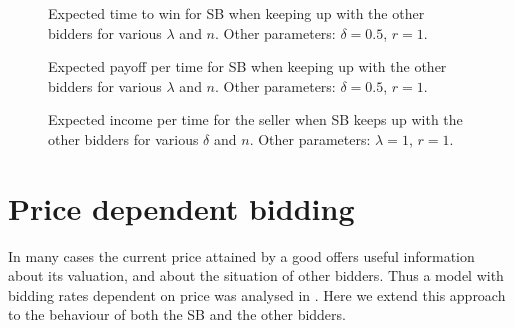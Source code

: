 \documentclass{comjnl}
\begin{document}
\begin{figure}
\centering
\caption{Expected time to win for SB when keeping up with the
other bidders for various $\lambda$ and $n$. Other parameters:
$\delta=0.5$, $r=1$.}\label{fig:ExpTime_SBKeepUp_VaryLambda}
\end{figure}


\begin{figure}
\centering
\caption{Expected payoff per time for SB when keeping up with the
other bidders for various $\lambda$ and $n$. Other parameters:
$\delta=0.5$,
$r=1$.}\label{fig:ExpPayoffPerTime_SBKeepUp_VaryLambda}
\end{figure}


\begin{figure}
\centering
\caption{Expected income per time for the seller when SB keeps up
with the other bidders for various $\delta$ and $n$. Other
parameters: $\lambda=1$,
$r=1$.}\label{fig:ExpIncomePerTime_SBKeepUp_VaryDelta}
\end{figure}



\section{Price dependent bidding} \label{Price-Dependent}

In many cases the current price attained by a good offers useful
information about its valuation, and about the situation of other
bidders. Thus a model with bidding rates dependent on price was
analysed in \cite{gelenbe06}. Here we extend this approach to the
behaviour of both the SB and the other bidders.
\end{document}
